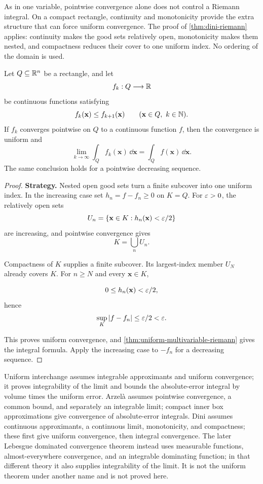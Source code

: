 As in one variable, pointwise convergence alone does not control a Riemann
integral.  On a compact rectangle, continuity and monotonicity provide the
extra structure that can force uniform convergence.
The proof of \cref{thm:dini-riemann} applies: continuity makes the good
sets relatively open, monotonicity makes them nested, and compactness
reduces their cover to one uniform index. No ordering of the domain is used.

\begin{theorem}
\label{thm:dini-multivariable-riemann}
Let \(Q\subseteq\mathbb{R}^n\) be a rectangle, and let
\[
f_k:Q\longrightarrow\mathbb{R}
\]
be continuous functions satisfying
\[
f_k(\mathbf{x})\leq f_{k+1}(\mathbf{x})
\qquad(\mathbf{x}\in Q,\ k\in\mathbb{N}).
\]
If \(f_k\) converges pointwise on \(Q\) to a continuous function \(f\),
then the convergence is uniform and
\[
\lim_{k\to\infty}\int_Qf_k(\mathbf{x})\,\dd\mathbf{x}
=
\int_Qf(\mathbf{x})\,\dd\mathbf{x}.
\]
The same conclusion holds for a pointwise decreasing sequence.
\end{theorem}
\begin{proof}
\textbf{Strategy.} Nested open good sets turn a finite subcover into one
uniform index. In the increasing case set $h_n=f-f_n\geq0$ on $K=Q$.
For $\varepsilon>0$, the relatively open sets
\[
U_n=\{\mathbf{x}\in K:h_n(\mathbf{x})<\varepsilon/2\}
\]
are increasing, and pointwise convergence gives
\[
K=\bigcup_n U_n.
\]

Compactness of $K$ supplies a finite subcover. Its largest-index member
$U_N$ already covers $K$. For $n\geq N$ and every $\mathbf{x}\in K$,

\[
0\leq h_n(\mathbf{x})<\varepsilon/2,
\]
 hence
\[
\sup_K|f-f_n|\leq\varepsilon/2<\varepsilon.
\]

This proves uniform convergence, and \cref{thm:uniform-multivariable-riemann} gives the integral formula.
Apply the increasing case to $-f_n$ for a decreasing sequence.
\end{proof}

\begin{remark}
Uniform interchange assumes integrable approximants and uniform convergence;
it proves integrability of the limit and bounds the absolute-error integral
by volume times the uniform error. Arzel\`a assumes pointwise convergence,
a common bound, and separately an integrable limit; compact inner box
approximations give convergence of absolute-error integrals.
Dini assumes continuous approximants, a continuous limit, monotonicity,
and compactness; these first give uniform convergence, then integral convergence.
The later Lebesgue dominated convergence theorem instead uses measurable
functions, almost-everywhere convergence, and an integrable dominating
function; in that different theory it also supplies integrability of the limit.
It is not the uniform theorem under another name and is not proved here.
\end{remark}

